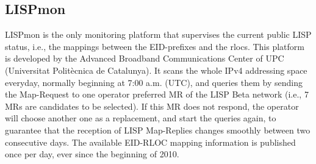 \subsection{LISPmon}
\label{subsec:monitor_LISPmon}

LISPmon is the only monitoring platform that supervises the current public LISP status, i.e., the mappings between the EID-prefixes and the \acrshort{rloc}s. This platform is developed by the Advanced Broadband Communications Center of UPC (Universitat Politècnica de Catalunya). It scans the whole IPv4 addressing space everyday, normally beginning at 7:00 a.m. (UTC), and queries them by sending the Map-Request to one operator preferred MR of the LISP Beta network (i.e., 7 MRs are candidates to be selected). If this MR does not respond, the operator will choose another one as a replacement, and start the queries again, to guarantee that the reception of LISP Map-Replies changes smoothly %
between two consecutive days. The available EID-RLOC mapping information is published once per day, ever since the beginning of 2010.

